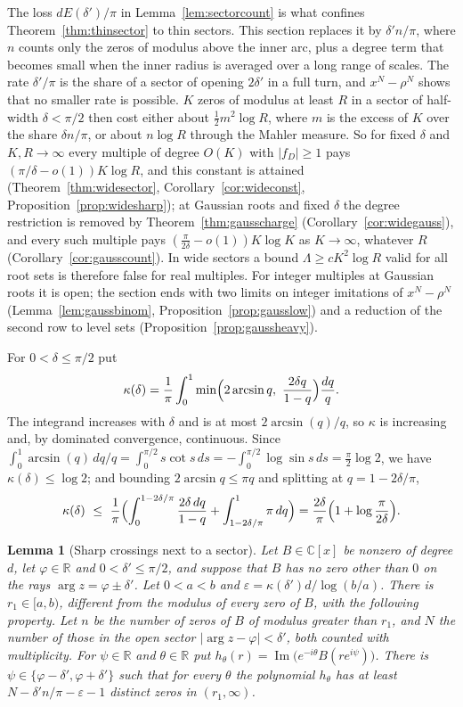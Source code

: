 \documentclass[11pt]{article}
\newtheorem{lemma}[theorem]{Lemma}
\newcommand{\R}{\mathbb R}
\begin{document}
The loss $dE(\delta')/\pi$ in Lemma~\ref{lem:sectorcount} is what confines
Theorem~\ref{thm:thinsector} to thin sectors.  This section replaces it by
$\delta'n/\pi$, where $n$ counts only the zeros of modulus above the inner
arc, plus a degree term that becomes small when the inner radius is averaged
over a long range of scales.  The rate $\delta'/\pi$ is the share of a
sector of opening $2\delta'$ in a full turn, and $x^N-\rho^N$ shows that no
smaller rate is possible.  $K$ zeros of modulus at least $R$ in a sector of
half-width $\delta<\pi/2$ then cost either about $\frac12m^2\log R$, where
$m$ is the excess of $K$ over the share $\delta n/\pi$, or about $n\log R$
through the Mahler measure.  So for fixed $\delta$ and $K,R\to\infty$
every multiple of degree $O(K)$ with $|f_D|\ge1$ pays
$(\pi/\delta-o(1))K\log R$, and this constant is attained
(Theorem~\ref{thm:widesector}, Corollary~\ref{cor:wideconst},
Proposition~\ref{prop:widesharp}); at Gaussian roots and fixed $\delta$ the
degree restriction is removed by Theorem~\ref{thm:gausscharge}
(Corollary~\ref{cor:widegauss}), and every such multiple pays
$(\frac\pi{2\delta}-o(1))K\log K$ as $K\to\infty$, whatever $R$
(Corollary~\ref{cor:gausscount}).
In wide sectors a bound $\Lambda\ge cK^2\log R$ valid for all root sets is
therefore false for real multiples.  For integer
multiples at Gaussian roots it is open; the section ends with two limits on
integer imitations of $x^N-\rho^N$ (Lemma~\ref{lem:gaussbinom},
Proposition~\ref{prop:gausslow}) and a reduction of the second row to level
sets (Proposition~\ref{prop:gaussheavy}).

For $0<\delta\le\pi/2$ put
\[
  \kappa(\delta)=\frac1\pi\int_0^1\min\Bigl(2\arcsin q,\ \frac{2\delta q}{1-q}\Bigr)\frac{dq}q .
\]
The integrand increases with $\delta$ and is at most $2\arcsin(q)/q$, so
$\kappa$ is increasing and, by dominated convergence, continuous.  Since
$\int_0^1\arcsin(q)\,dq/q=\int_0^{\pi/2}s\cot s\,ds=-\int_0^{\pi/2}\log\sin s\,ds
=\frac\pi2\log2$, we have $\kappa(\delta)\le\log2$; and bounding
$2\arcsin q\le\pi q$ and splitting at $q=1-2\delta/\pi$,
\[
  \kappa(\delta)\ \le\ \frac1\pi\Bigl(\int_0^{1-2\delta/\pi}\frac{2\delta\,dq}{1-q}
  +\int_{1-2\delta/\pi}^1\pi\,dq\Bigr)
  =\frac{2\delta}\pi\Bigl(1+\log\frac\pi{2\delta}\Bigr).
\]

\begin{lemma}[Sharp crossings next to a sector]\label{lem:sharpcross}
Let $B\in\mathbb C[x]$ be nonzero of degree $d$, let $\varphi\in\R$ and
$0<\delta'\le\pi/2$, and suppose that $B$ has no zero other than $0$ on the
rays $\arg z=\varphi\pm\delta'$.  Let $0<a<b$ and
$\varepsilon=\kappa(\delta')d/\log(b/a)$.  There is $r_1\in[a,b)$, different
from the modulus of every zero of $B$, with the following property.  Let $n$
be the number of zeros of $B$ of modulus greater than $r_1$, and $N$ the
number of those in the open sector $|\arg z-\varphi|<\delta'$, both counted
with multiplicity.  For $\psi\in\R$ and $\theta\in\R$ put
$h_\theta(r)=\operatorname{Im}\bigl(e^{-i\theta}B(re^{i\psi})\bigr)$.
There is $\psi\in\{\varphi-\delta',\varphi+\delta'\}$ such that for
every $\theta$ the polynomial $h_\theta$ has at least
$N-\delta'n/\pi-\varepsilon-1$ distinct zeros in $(r_1,\infty)$.
\end{lemma}
\end{document}
